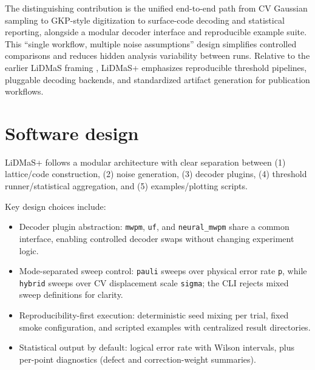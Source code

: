 \documentclass[
]{article}
\providecommand{\tightlist}{%
  \setlength{\itemsep}{0pt}\setlength{\parskip}{0pt}}
\begin{document}
The distinguishing contribution is the unified end-to-end path from CV
Gaussian sampling to GKP-style digitization to surface-code decoding and
statistical reporting, alongside a modular decoder interface and
reproducible example suite. This ``single workflow, multiple noise
assumptions'' design simplifies controlled comparisons and reduces
hidden analysis variability between runs. Relative to the earlier LiDMaS
framing \citep{wayo2026lidmas}, LiDMaS+ emphasizes reproducible
threshold pipelines, pluggable decoding backends, and standardized
artifact generation for publication workflows.

\section{Software design}\label{software-design}

LiDMaS+ follows a modular architecture with clear separation between (1)
lattice/code construction, (2) noise generation, (3) decoder plugins,
(4) threshold runner/statistical aggregation, and (5) examples/plotting
scripts.

Key design choices include:

\begin{itemize}
\tightlist
\item
  Decoder plugin abstraction: \texttt{mwpm}, \texttt{uf}, and
  \texttt{neural\_mwpm} share a common interface, enabling controlled
  decoder swaps without changing experiment logic.
\item
  Mode-separated sweep control: \texttt{pauli} sweeps over physical
  error rate \texttt{p}, while \texttt{hybrid} sweeps over CV
  displacement scale \texttt{sigma}; the CLI rejects mixed sweep
  definitions for clarity.
\item
  Reproducibility-first execution: deterministic seed mixing per trial,
  fixed smoke configuration, and scripted examples with centralized
  result directories.
\item
  Statistical output by default: logical error rate with Wilson
  intervals, plus per-point diagnostics (defect and correction-weight
  summaries).
\end{itemize}
\end{document}
